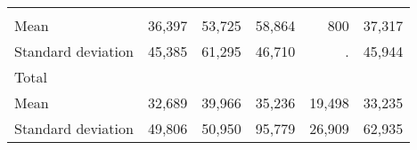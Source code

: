 \begin{tabular}{llllll}
  \multicolumn{1}{|r}{} &
  \multicolumn{1}{r}{} &
  \multicolumn{1}{r}{} &
  \multicolumn{1}{r}{} &
  \multicolumn{1}{r}{} \\
\multicolumn{1}{l}{\hspace{4em}Mean} &
  \multicolumn{1}{|r}{36,397} &
  \multicolumn{1}{r}{53,725} &
  \multicolumn{1}{r}{58,864} &
  \multicolumn{1}{r}{800} &
  \multicolumn{1}{r}{37,317} \\
\multicolumn{1}{l}{\hspace{4em}Standard deviation} &
  \multicolumn{1}{|r}{45,385} &
  \multicolumn{1}{r}{61,295} &
  \multicolumn{1}{r}{46,710} &
  \multicolumn{1}{r}{.} &
  \multicolumn{1}{r}{45,944} \\
\multicolumn{1}{l}{\hspace{3em}Total} &
  \multicolumn{1}{|r}{} &
  \multicolumn{1}{r}{} &
  \multicolumn{1}{r}{} &
  \multicolumn{1}{r}{} &
  \multicolumn{1}{r}{} \\
\multicolumn{1}{l}{\hspace{4em}Mean} &
  \multicolumn{1}{|r}{32,689} &
  \multicolumn{1}{r}{39,966} &
  \multicolumn{1}{r}{35,236} &
  \multicolumn{1}{r}{19,498} &
  \multicolumn{1}{r}{33,235} \\
\multicolumn{1}{l}{\hspace{4em}Standard deviation} &
  \multicolumn{1}{|r}{49,806} &
  \multicolumn{1}{r}{50,950} &
  \multicolumn{1}{r}{95,779} &
  \multicolumn{1}{r}{26,909} &
  \multicolumn{1}{r}{62,935} \\
\cline{1-6}
\end{tabular}

